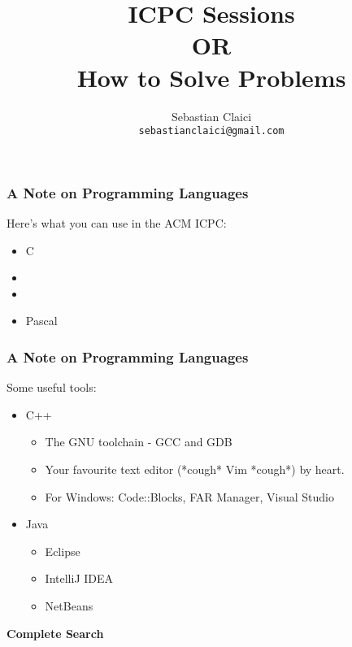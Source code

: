 \documentclass{beamer}
\title{ICPC Sessions \\
    OR \\
    How to Solve Problems
}
\author{Sebastian Claici \\
    \texttt{sebastianclaici@gmail.com}
}
\begin{document}
\maketitle

\begin{frame}
    \frametitle{A Note on Programming Languages}
    
    Here's what you can use in the ACM ICPC:

    \begin{itemize}
        \item C
        \item {} 
        \item {} 
        \item Pascal
    \end{itemize}
\end{frame}

\begin{frame}
    \frametitle{A Note on Programming Languages}

    Some useful tools:

    \begin{itemize}
            \pause
        \item C++
            \begin{itemize}
                    \pause
                \item The GNU toolchain - GCC and GDB
                    \pause
                \item Your favourite text editor (*cough* Vim *cough*) by heart.
                    \pause
                \item For Windows: Code::Blocks, FAR Manager, Visual Studio
            \end{itemize}
            \pause
        \item Java
            \begin{itemize}
                    \pause
                \item Eclipse
                    \pause
                \item IntelliJ IDEA
                    \pause
                \item NetBeans
            \end{itemize}
    \end{itemize}
\end{frame}

\begin{frame}
    \vspace*{\fill}
    \begingroup
    \centering
    \begin{center}
        \huge \textbf{Complete Search}
    \end{center}
    \endgroup
    \vspace*{\fill}
\end{frame}
\end{document}
